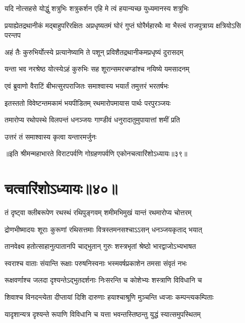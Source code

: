 \twolineshloka
{यदि नोत्सहसे योद्धुं शत्रुभिः शत्रुकर्शन}
{एहि मे त्वं हयान्यच्छ युध्यमानस्य शत्रुभिः}


\threelineshloka
{प्रयाह्येतद्रथानीकं मद्बाहुपरिरक्षितः}
{अप्रधृष्यतमं घोरं गुप्तं घोरैर्महारथैः}
{मा भैस्त्वं राजपुत्राग्र्य क्षत्रियोऽसि परन्तप}


\twolineshloka
{अहं तैः कुरुभिर्योत्स्ये प्रत्यानेष्यामि ते पशून्}
{प्रविशैतद्रथानीकमप्रधृष्यं दुरासदम्}


\twolineshloka
{यन्ता भव नरश्रेष्ठ योत्स्येऽहं कुरुभिः सह}
{शूरान्समरचण्डांश्च नयिष्ये यमसादनम्}



\twolineshloka
{एवं ब्रुवाणो वैराटिं बीभत्सुरपराजितः}
{समाश्वास्य भयार्तं तमुत्तरं भरतर्षभः}


\twolineshloka
{इतस्ततो विवेष्टन्तमकामं भयपीडितम्}
{रथमारोपमायास पार्थः परपुरञ्जयः}


\twolineshloka
{तमारोप्य रथोपस्थे विलपन्तं धनञ्जयः}
{गाण्डीवं धनुरादातुमुपायात्तां शमीं प्रति}



\onelineshloka
{उत्तरं तं समाश्वास्य कृत्वा यन्तारमर्जुनः}


॥इति श्रीमन्महाभारते विराटपर्वणि गोग्रहणपर्वणि एकोनचत्वारिंशोऽध्यायः॥३९॥

\chapter{चत्वारिंशोऽध्यायः॥४०॥}

\twolineshloka
{तं दृष्ट्वा क्लीबरूपेण रथस्थं रथिपुङ्गवम्}
{शमीमभिमुखं यान्तं रथमारोप्य चोत्तरम्}


\twolineshloka
{द्रोणभीष्मादयः शूराः कुरूणां रथिसत्तमाः}
{वित्रस्तमनसश्चाऽऽसन् धनञ्जयकृताद् भयात्}


\twolineshloka
{तानवेक्ष्य हतोत्साहानुत्पातानपि चाद्भुतान्}
{गुरुः शस्त्रभृतां श्रेष्ठो भारद्वाजोऽभ्यभाषत}


\twolineshloka
{स्वराश्च वाताः संयान्ति रूक्षाः परुषनिस्वनाः}
{भस्मवर्षप्रकाशेन तमसा संवृतं नभः}


\twolineshloka
{रूक्षवर्णाश्च जलदा दृश्यन्तेऽद्भुतदर्शनाः}
{निःसरन्ति च कोशेभ्यः शस्त्राणि विविधानि च}


\twolineshloka
{शिवाश्च विनदन्त्येता दीप्तायां दिशि दारुणाः}
{हयाश्चाश्रूणि मुञ्चन्ति ध्वजाः कम्पन्त्यकम्पिताः}


\twolineshloka
{यादृशान्यत्र दृश्यन्ते रूपाणि विविधानि च}
{यत्ता भवन्तस्तिष्ठन्तु युद्धं स्यात्समुपस्थितम्}


